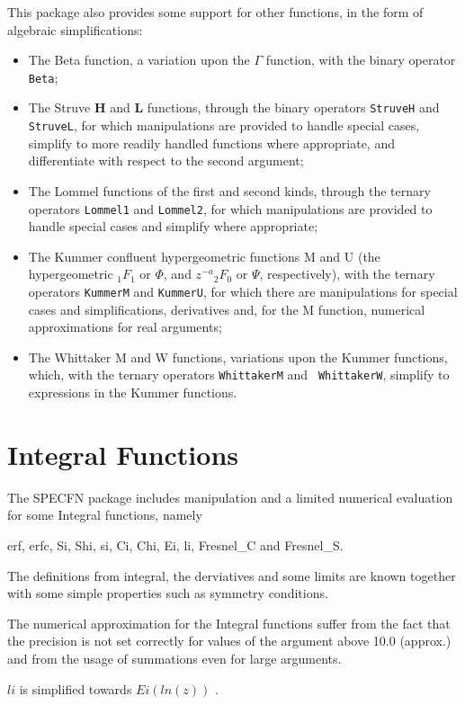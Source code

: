 This package also provides some support for other functions, in the form
of algebraic simplifications:
\begin{itemize}
\item The Beta function, a variation upon the $\Gamma$
function\cite{Abramowitz:72}, with the binary operator {\tt Beta};
\item The Struve {\bf H} and {\bf L} functions, through the binary
operators {\tt StruveH} and {\tt StruveL}, for which manipulations are
provided to handle special cases, simplify to more readily handled
functions where appropriate, and differentiate with respect to the second
argument;
\item The Lommel functions of the first and second kinds, through the
ternary operators {\tt Lommel1} and {\tt Lommel2}, for which manipulations
are provided to handle special cases and simplify where appropriate;
\item The Kummer confluent hypergeometric functions M and U (the
hypergeometric ${_1F_1}$ or $\Phi$, and $z^{-a}{_2F_0}$ or $\Psi$,
respectively),
with the ternary operators {\tt KummerM} and {\tt KummerU}, for which
there are manipulations for special cases and simplifications, derivatives
and, for the M function, numerical approximations for real arguments;
\item The Whittaker M and W functions, variations upon the Kummer
functions, which, with the ternary operators {\tt WhittakerM} and {\tt
WhittakerW}, simplify to expressions in the Kummer functions.
\end{itemize}

\section{Integral Functions}

The SPECFN package includes manipulation and a limited numerical
evaluation for some Integral functions, namely

erf, erfc, Si, Shi, si, Ci, Chi, Ei, li,  Fresnel\_C and Fresnel\_S.

The definitions from integral, the derviatives and some limits are
known together with some simple properties such as symmetry
conditions.

The numerical approximation for the Integral functions suffer
from the fact that the precision is not set correctly for
values of the argument above 10.0 (approx.) and from the
usage of summations even for large arguments.

$li$ is simplified towards $Ei(ln(z))$ . 

